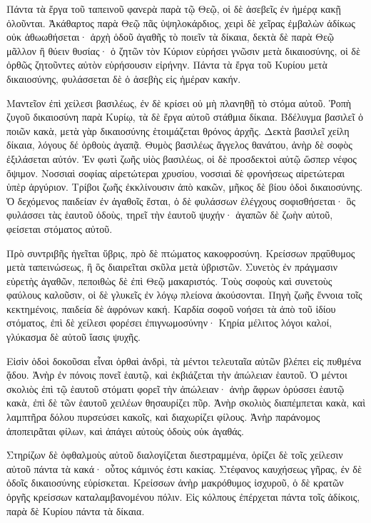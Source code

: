 {Πάντα τὰ ἔργα τοῦ ταπεινοῦ φανερὰ παρὰ τῷ Θεῷ, οἱ δὲ ἀσεβεῖς ἐν ἡμέρᾳ κακῇ ὀλοῦνται.
Ἀκάθαρτος παρὰ Θεῷ πᾶς ὑψηλοκάρδιος, χειρὶ δὲ χεῖρας ἐμβαλὼν ἀδίκως οὐκ ἀθωωθήσεται·
ἀρχὴ ὁδοῦ ἀγαθῆς τὸ ποιεῖν τὰ δίκαια, δεκτὰ δὲ παρὰ Θεῷ μᾶλλον ἢ θύειν θυσίας·
ὁ ζητῶν τὸν Κύριον εὑρήσει γνῶσιν μετὰ δικαιοσύνης, οἱ δὲ ὀρθῶς ζητοῦντες αὐτὸν εὑρήσουσιν εἰρήνην.
Πάντα τὰ ἔργα τοῦ Κυρίου μετὰ δικαιοσύνης, φυλάσσεται δὲ ὁ ἀσεβὴς εἰς ἡμέραν κακήν.
\par }{\PP {}Μαντεῖον ἐπὶ χείλεσι βασιλέως, ἐν δὲ κρίσει οὐ μὴ πλανηθῇ τὸ στόμα αὐτοῦ.
Ῥοπὴ ζυγοῦ δικαιοσύνη παρὰ Κυρίῳ, τὰ δὲ ἔργα αὐτοῦ στάθμια δίκαια.
Βδέλυγμα βασιλεῖ ὁ ποιῶν κακὰ, μετὰ γὰρ δικαιοσύνης ἑτοιμάζεται θρόνος ἀρχῆς.
Δεκτὰ βασιλεῖ χείλη δίκαια, λόγους δέ ὀρθοὺς ἀγαπᾷ.
Θυμὸς βασιλέως ἄγγελος θανάτου, ἀνὴρ δὲ σοφὸς ἐξιλάσεται αὐτόν.
Ἐν φωτὶ ζωῆς υἱὸς βασιλέως, οἱ δὲ προσδεκτοὶ αὐτῷ ὥσπερ νέφος ὄψιμον.
Νοσσιαὶ σοφίας αἱρετώτεραι χρυσίου, νοσσιαὶ δὲ φρονήσεως αἱρετώτεραι ὑπὲρ ἀργύριον.
Τρίβοι ζωῆς ἐκκλίνουσιν ἀπὸ κακῶν, μῆκος δὲ βίου ὁδοὶ δικαιοσύνης. Ὁ δεχόμενος παιδείαν ἐν ἀγαθοῖς ἔσται, ὁ δὲ φυλάσσων ἐλέγχους σοφισθήσεται· ὃς φυλάσσει τὰς ἑαυτοῦ ὁδοὺς, τηρεῖ τὴν ἑαυτοῦ ψυχήν· ἀγαπῶν δὲ ζωὴν αὐτοῦ, φείσεται στόματος αὐτοῦ.
\par }{\PP {}Πρὸ συντριβῆς ἡγεῖται ὕβρις, πρὸ δὲ πτώματος κακοφροσύνη.
Κρείσσων πρᾳΰθυμος μετὰ ταπεινώσεως, ἢ ὃς διαιρεῖται σκῦλα μετὰ ὑβριστῶν.
Συνετὸς ἐν πράγμασιν εὑρετὴς ἀγαθῶν, πεποιθὼς δὲ ἐπὶ Θεῷ μακαριστός.
Τοὺς σοφοὺς καὶ συνετοὺς φαύλους καλοῦσιν, οἱ δὲ γλυκεῖς ἐν λόγῳ πλείονα ἀκούσονται.
Πηγὴ ζωῆς ἔννοια τοῖς κεκτημένοις, παιδεία δὲ ἀφρόνων κακή.
Καρδία σοφοῦ νοήσει τὰ ἀπὸ τοῦ ἰδίου στόματος, ἐπὶ δὲ χείλεσι φορέσει ἐπιγνωμοσύνην·
Κηρία μέλιτος λόγοι καλοί, γλύκασμα δὲ αὐτοῦ ἴασις ψυχῆς.
\par }{\PP {}Εἰσὶν ὁδοὶ δοκοῦσαι εἶναι ὀρθαὶ ἀνδρὶ, τὰ μέντοι τελευταῖα αὐτῶν βλέπει εἰς πυθμένα ᾅδου.
Ἀνὴρ ἐν πόνοις πονεῖ ἑαυτῷ, καὶ ἐκβιάζεται τὴν ἀπώλειαν ἑαυτοῦ. Ὁ μέντοι σκολιὸς ἐπὶ τῷ ἑαυτοῦ στόματι φορεῖ τὴν ἀπώλειαν·
ἀνὴρ ἄφρων ὀρύσσει ἑαυτῷ κακὰ, ἐπὶ δὲ τῶν ἑαυτοῦ χειλέων θησαυρίζει πῦρ.
Ἀνὴρ σκολιὸς διαπέμπεται κακὰ, καὶ λαμπτῆρα δόλου πυρσεύσει κακοῖς, καὶ διαχωρίζει φίλους.
Ἀνὴρ παράνομος ἀποπειρᾶται φίλων, καὶ ἀπάγει αὐτοὺς ὁδοὺς οὐκ ἀγαθάς.
\par }{\PP {}Στηρίζων δὲ ὀφθαλμοὺς αὐτοῦ διαλογίζεται διεστραμμένα, ὁρίζει δὲ τοῖς χείλεσιν αὐτοῦ πάντα τὰ κακά· οὗτος κάμινός ἐστι κακίας.
Στέφανος καυχήσεως γῆρας, ἐν δὲ ὁδοῖς δικαιοσύνης εὑρίσκεται.
Κρείσσων ἀνὴρ μακρόθυμος ἰσχυροῦ, ὁ δὲ κρατῶν ὀργῆς κρείσσων καταλαμβανομένου πόλιν.
Εἰς κόλπους ἐπέρχεται πάντα τοῖς ἀδίκοις, παρὰ δὲ Κυρίου πάντα τὰ δίκαια.

}
